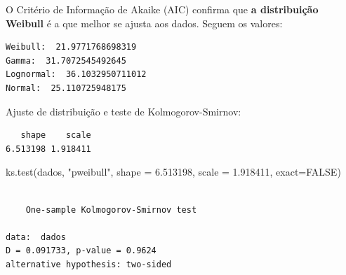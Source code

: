 \documentclass[
  letterpaper,
  DIV=11,
  numbers=noendperiod]{scrartcl}
\newenvironment{Shaded}{\begin{snugshade}}{\end{snugshade}}
\newcommand{\AttributeTok}[1]{\textcolor[rgb]{0.40,0.45,0.13}{#1}}
\newcommand{\ConstantTok}[1]{\textcolor[rgb]{0.56,0.35,0.01}{#1}}
\newcommand{\FloatTok}[1]{\textcolor[rgb]{0.68,0.00,0.00}{#1}}
\newcommand{\FunctionTok}[1]{\textcolor[rgb]{0.28,0.35,0.67}{#1}}
\newcommand{\NormalTok}[1]{\textcolor[rgb]{0.00,0.23,0.31}{#1}}
\newcommand{\OtherTok}[1]{\textcolor[rgb]{0.00,0.23,0.31}{#1}}
\newcommand{\SpecialCharTok}[1]{\textcolor[rgb]{0.37,0.37,0.37}{#1}}
\newcommand{\StringTok}[1]{\textcolor[rgb]{0.13,0.47,0.30}{#1}}
\begin{document}
O Critério de Informação de Akaike (AIC) confirma que \textbf{a
distribuição Weibull} é a que melhor se ajusta aos dados. Seguem os
valores:

\begin{Shaded}
\end{Shaded}

\begin{verbatim}
Weibull:  21.9771768698319 
Gamma:  31.7072545492645 
Lognormal:  36.1032950711012 
Normal:  25.110725948175
\end{verbatim}

Ajuste de distribuição e teste de Kolmogorov-Smirnov:

\begin{Shaded}
\end{Shaded}

\begin{verbatim}
   shape    scale 
6.513198 1.918411 
\end{verbatim}

\begin{Shaded}
\begin{Highlighting}[]
\FunctionTok{ks.test}\NormalTok{(dados, }\StringTok{"pweibull"}\NormalTok{, }\AttributeTok{shape =} \FloatTok{6.513198}\NormalTok{, }\AttributeTok{scale =} \FloatTok{1.918411}\NormalTok{, }\AttributeTok{exact=}\ConstantTok{FALSE}\NormalTok{)}
\end{Highlighting}
\end{Shaded}

\begin{verbatim}

    One-sample Kolmogorov-Smirnov test

data:  dados
D = 0.091733, p-value = 0.9624
alternative hypothesis: two-sided
\end{verbatim}
\end{document}
